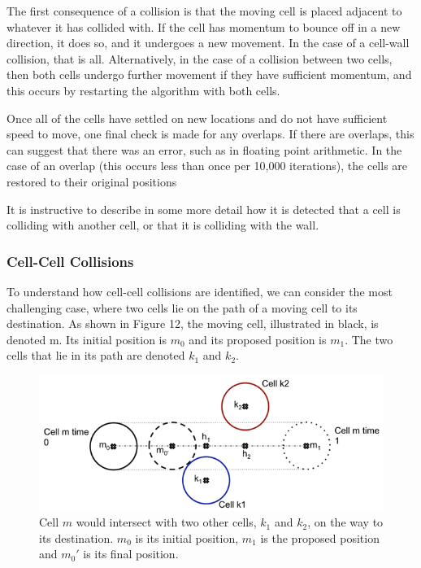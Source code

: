 \documentclass[12pt]{article}
\begin{document}
The first consequence of a collision is that the moving cell is placed 
adjacent to whatever it has collided with. If the cell has momentum to 
bounce off in a new direction, it does so, and it undergoes a new 
movement. In the case of a cell-wall collision, that is all. 
Alternatively, in the case of a collision between two cells, then both 
cells undergo further movement if they have sufficient momentum, and 
this occurs by restarting the algorithm with both cells.

Once all of the cells have settled on new locations and do not have 
sufficient speed to move, one final check is made for any overlaps. If 
there are overlaps, this can suggest that there was an error, such as in 
floating point arithmetic. In the case of an overlap (this occurs less 
than once per 10,000 iterations), the cells are restored to their 
original positions

It is instructive to describe in some more detail how it is detected 
that a cell is colliding with another cell, or that it is colliding with 
the wall.

\subsubsection{Cell-Cell Collisions}
To understand how cell-cell collisions are identified, we can consider 
the most challenging case, where two cells lie on the path of a moving 
cell to its destination. As shown in Figure 12, the moving cell, 
illustrated in black, is denoted m. Its initial position is \(m_0\) 
and its proposed position is \(m_1\). The two cells that lie in its 
path are denoted \(k_1\) and \(k_2\).

\begin{figure}[H]
\centering
\includegraphics[width=\textwidth]{media/collision.png}
\caption{Cell \(m\) would intersect with two other 
  cells, \(k_1\) and \(k_2\), on the way to its destination. 
  \(m_0\) is its initial position, \(m_1\) is the proposed position and 
\(m_0'\) is its final position.}
\end{figure}
\end{document}
